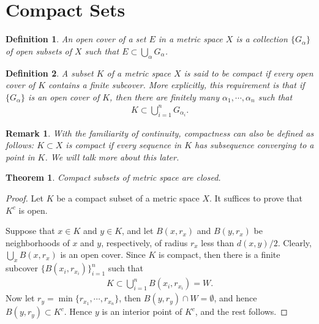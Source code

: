 \documentclass[10pt]{book}
\newtheorem{definition}{Definition}[chapter]
\newtheorem{theorem}{Theorem}[chapter]
\newtheorem{remark}{Remark}[chapter]
\theoremstyle{definition}
\numberwithin{equation}{chapter}
\begin{document}
\medskip


\section{Compact Sets}

\begin{definition}
An open cover of a set $E$ in a metric space $X$ is a collection $\{G_{\alpha}\}$ of open subsets of $X$ such that $E \subset \bigcup_{\alpha} G_{\alpha}$.
\end{definition}

\medskip

\begin{definition}
A subset $K$ of a metric space $X$ is said to be compact if every open cover of $K$ contains a finite subcover. More explicitly, this requirement is that if $\{G_{\alpha}\}$ is an open cover of $K$, then there are finitely many $\alpha_1, \cdots, \alpha_n$ such that 
\begin{align*}
    K \subset \bigcup^n_{i=1} G_{\alpha_i}.
\end{align*}
\end{definition}

\begin{remark}
With the familiarity of continuity, compactness can also be defined as follows: $K \subset X$ is compact if every sequence in $K$ has subsequence converging to a point in $K$. We will talk more about this later.
\end{remark}

\medskip

\begin{theorem}\label{th_115}
Compact subsets of metric space are closed.
\end{theorem}
\begin{proof}
Let $K$ be a compact subset of a metric space $X$. It suffices to prove that $K^c$ is open.

Suppose that $x \in K$ and $y \in K$, and let $B(x,r_x)$ and $B(y,r_x)$ be neighborhoods of $x$ and $y$, respectively, of radius $r_x$ less than $d(x,y)/2$. Clearly, $\bigcup_x B(x,r_x)$ is an open cover. Since $K$ is compact, then there is a finite subcover $\{B\left(x_i, r_{x_i}\right)\}^n_{i=1}$ such that 
\begin{align*}
    K \subset \bigcup^n_{i=1} B\left(x_i, r_{x_i}\right) = W.
\end{align*}
Now let $r_y = \min \{r_{x_1}, \cdots, r_{x_n}\}$, then $B(y,r_y) \cap W = \emptyset$, and hence $B(y,r_y) \subset K^c$. Hence $y$ is an interior point of $K^c$, and the rest follows.
\end{proof}
\end{document}
